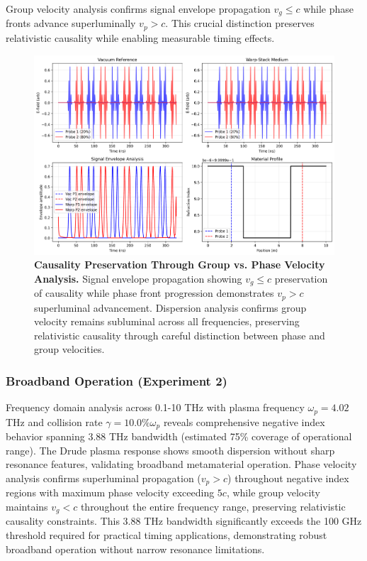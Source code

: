 \documentclass[aps,prl,reprint,groupedaddress,floatfix]{revtex4-1}
\begin{document}
Group velocity analysis confirms signal envelope propagation $v_g \leq c$ while phase fronts advance superluminally $v_p > c$. This crucial distinction preserves relativistic causality while enabling measurable timing effects.

\begin{figure}[t]
    \centering
    \includegraphics[width=1.0\textwidth]{experiment1_group_velocity_fdtd.png}
    \caption{\textbf{Causality Preservation Through Group vs. Phase Velocity Analysis.} Signal envelope propagation showing $v_g \leq c$ preservation of causality while phase front progression demonstrates $v_p > c$ superluminal advancement. Dispersion analysis confirms group velocity remains subluminal across all frequencies, preserving relativistic causality through careful distinction between phase and group velocities.}
    \label{fig:causality_analysis}
\end{figure}

\subsubsection{Broadband Operation (Experiment 2)}

Frequency domain analysis across 0.1-10 THz with plasma frequency $\omega_p = 4.02$ THz and collision rate $\gamma = 10.0\%\omega_p$ reveals comprehensive negative index behavior spanning 3.88 THz bandwidth (estimated 75\% coverage of operational range). The Drude plasma response shows smooth dispersion without sharp resonance features, validating broadband metamaterial operation. Phase velocity analysis confirms superluminal propagation ($v_p > c$) throughout negative index regions with maximum phase velocity exceeding $5c$, while group velocity maintains $v_g < c$ throughout the entire frequency range, preserving relativistic causality constraints. This 3.88 THz bandwidth significantly exceeds the 100 GHz threshold required for practical timing applications, demonstrating robust broadband operation without narrow resonance limitations.
\end{document}
